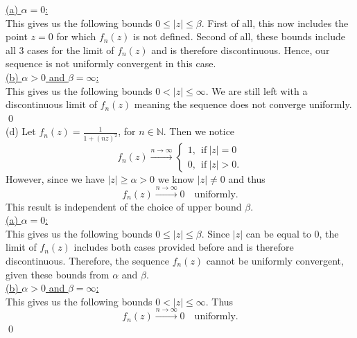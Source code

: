 \documentclass[10pt]{amsart}
\theoremstyle{nonumberplain}
\begin{document}
\begin{enumerate}[label={\bf {\arabic*}:}]
\underline{(a) $\alpha = 0$:} \\
This gives us the following bounds $0 \leq |z| \leq \beta$.
First of all, this now includes the point $z = 0$ for which $f_n(z)$ is not defined.
Second of all, these bounds include all 3 cases for the limit of $f_n(z)$ and is therefore discontinuous.
Hence, our sequence is not uniformly convergent in this case. \\

\underline{(b) $\alpha > 0$ and $\beta = \infty$:} \\
This gives us the following bounds $0 < |z| \leq \infty$.
We are still left with a discontinuous limit of $f_n(z)$ meaning the sequence does not converge uniformly. \\
\qed \\

\noindent
(d) Let $f_n(z) = \frac 1 {1 + (nz)^2}$, for $n \in \mathbb N$. Then we notice
$$
f_n(z) \overset{n \to \infty}{\longrightarrow} \begin{cases}
1, \: \: \text{if}\: |z| = 0 \\
0, \: \: \text{if}\: |z| > 0.
\end{cases}
$$
However, since we have $|z| \geq \alpha > 0$ we know $|z| \neq 0$ and thus
$$
f_n(z) \overset{n \to \infty}{\longrightarrow} 0 \quad \text{uniformly}.
$$
This result is independent of the choice of upper bound $\beta$. \\

\underline{(a) $\alpha = 0$:} \\
This gives us the following bounds $0 \leq |z| \leq \beta$.
Since $|z|$ can be equal to $0$, the limit of $f_n(z)$ includes both cases provided before and is therefore discontinuous.
Therefore, the sequence $f_n(z)$ cannot be uniformly convergent, given these bounds from $\alpha$ and $\beta$. \\

\underline{(b) $\alpha > 0$ and $\beta = \infty$:} \\
This gives us the following bounds $0 < |z| \leq \infty$.
Thus
$$
f_n(z) \overset{n \to \infty}{\longrightarrow} 0 \quad \text{uniformly}.
$$
\qed \\


\end{enumerate}
\end{document}
